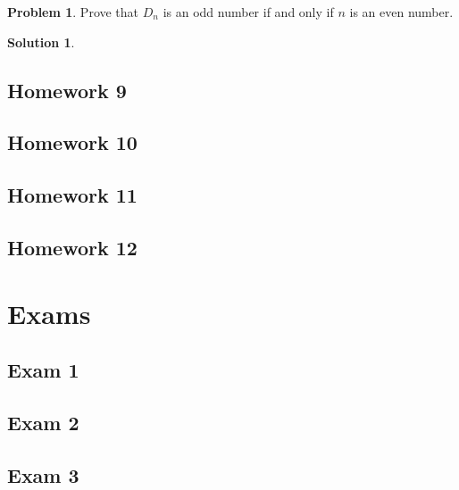 \documentclass[10pt,a4paper,titlepage,twoside,draft]{article}
\theoremstyle{plain}
\theoremstyle{definition}
\newtheorem*{prob}{Problem}
\newtheorem*{sol}{Solution}
\theoremstyle{remark}
\begin{document}
\begin{prob}
Prove that $D_n$ is an odd number if and only if $n$ is an even number.
\end{prob}

\medskip

\begin{sol}

\end{sol}


\subsection{Homework 9}

\subsection{Homework 10}

\subsection{Homework 11}

\subsection{Homework 12}

\section{Exams}

\subsection{Exam 1}

\subsection{Exam 2}

\subsection{Exam 3}
\end{document}
